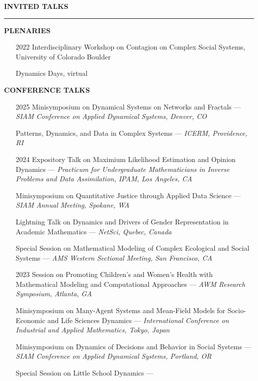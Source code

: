 \documentclass{resume} %
\renewenvironment{rSection}[1]{
\sectionskip
\textcolor{WinePurple}{\MakeUppercase{#1}}
\sectionlineskip
\hrule
\begin{list}{}{
\setlength{\leftmargin}{1.5em}
}
\item[]
}{
\end{list}
}
\begin{document}

\begin{rSection}{\bf Invited Talks}

\medskip

\uppercase{\textbf{Plenaries}}

\begin{itemize}
    \item[2022] Interdisciplinary Workshop on Contagion on Complex Social Systems, University of Colorado Boulder
    \item[] Dynamics Days, virtual
\end{itemize}

\uppercase{\textbf{Conference Talks}}
\begin{itemize}
    \item[2025] Minisymposium on Dynamical Systems on Networks and Fractals --- {\em SIAM Conference on Applied Dynamical Systems, Denver, CO}
    \item[] Patterns, Dynamics, and Data in Complex Systems --- {\em ICERM, Providence, RI} 
    \item[2024] Expository Talk on Maximium Likelihood Estimation and Opinion Dynamics --- {\em Practicum for Undergraduate Mathematicians in Inverse Problems and Data Assimilation, IPAM, Los Angeles, CA}
    \item[] Minisymposium on Quantitative Justice through Applied Data Science --- {\em SIAM Annual Meeting, Spokane, WA}
    \item[] Lightning Talk on Dynamics and Drivers of Gender Representation in Academic Mathematics --- {\em NetSci, Quebec, Canada}
    \item[] Special Session on Mathematical Modeling of Complex Ecological and Social Systems --- {\em AMS Western Sectional Meeting, San Francisco, CA}
    \item[2023] Session on Promoting Children's and Women's Health with Mathematical Modeling and Computational
    Approaches ---
    {\em AWM Research Symposium, Atlanta, GA}
    \item[] Minisymposium on Many-Agent Systems and Mean-Field Models for Socio-Economic and Life Sciences Dynamics ---
    {\em International Conference on Industrial and Applied Mathematics, Tokyo, Japan}
    \item[] Minisymposium on Dynamics of Decisions and Behavior in Social Systems ---
    {\em SIAM Conference on Applied Dynamical Systems, Portland, OR}
    \item[] Special Session on Little School Dynamics ---

\end{itemize}
\end{rSection}
\end{document}
